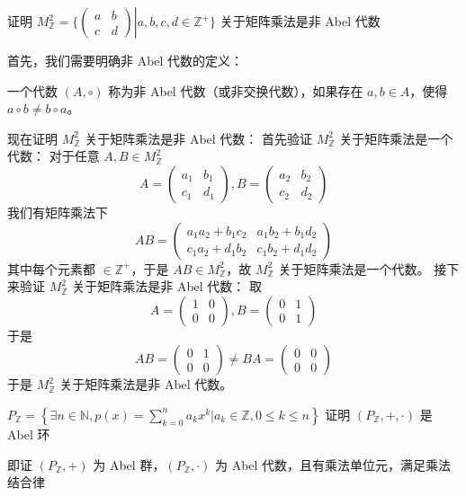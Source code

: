 \begin{exercise}
证明 $M^{2}_{\mathbb{Z}}=\{ \left.\begin{pmatrix}a&b\\c&d\end{pmatrix}\right|a,b,c,d\in \mathbb{Z}^{+} \}$ 关于矩阵乘法是非 Abel 代数
\end{exercise}
首先，我们需要明确非 Abel 代数的定义：

\begin{definition}[非 Abel 代数]
一个代数 $(A, \circ)$ 称为非 Abel 代数（或非交换代数），如果存在 $a, b \in A$，使得 $a \circ b \neq b \circ a$。
\end{definition}
现在证明 $M^{2}_{\mathbb{Z}}$ 关于矩阵乘法是非 Abel 代数：
首先验证 $M^{2}_{\mathbb{Z}}$ 关于矩阵乘法是一个代数：
对于任意 $A, B \in M^{2}_{\mathbb{Z}}$
\[
A=\begin{pmatrix}
a_{1} & b_{1} \\
c_{1} & d_{1} 
\end{pmatrix},B=\begin{pmatrix}
a_{2} & b_{2}  \\
c_{2} & d_{2} 
\end{pmatrix}
\]
我们有矩阵乘法下
\[
AB=\begin{pmatrix}
a_{1}a_{2}+b_{1}c_{2} & a_{1}b_{2}+b_{1}d_{2} \\
c_{1}a_{2}+d_{1}b_{2} & c_{1}b_{2}+d_{1}d_{2}
\end{pmatrix}
\]
其中每个元素都 $\in \mathbb{Z}^{+}$，于是 $AB\in M^{2}_{\mathbb{Z}}$，故 $M^{2}_{\mathbb{Z}}$ 关于矩阵乘法是一个代数。
接下来验证 $M^{2}_{\mathbb{Z}}$ 关于矩阵乘法是非 Abel 代数：
取
\[
A=\begin{pmatrix}
1 & 0 \\
0 & 0
\end{pmatrix},B=\begin{pmatrix}
0 & 1  \\
0  & 1
\end{pmatrix}
\]
于是
\[
AB=\begin{pmatrix}
0 & 1 \\
0 & 0
\end{pmatrix}\neq BA=\begin{pmatrix}
0 & 0  \\
0 & 0
\end{pmatrix}
\]
于是 $M^{2}_{\mathbb{Z}}$ 关于矩阵乘法是非 Abel 代数。

\begin{exercise}
$P_{\mathbb{Z}}=\left\{  \exists n\in \mathbb{N},p(x)=\sum_{k=0}^{n}a_{k}x^{k}|a_{k}\in \mathbb{Z},0\leq k\leq n  \right\}$ 证明 $(P_{\mathbb{Z}},+,\cdot)$ 是 Abel 环
\end{exercise}
即证 $(P_{\mathbb{Z}},+)$ 为 Abel 群，$(P_{\mathbb{Z}},\cdot)$ 为 Abel 代数，且有乘法单位元，满足乘法结合律

